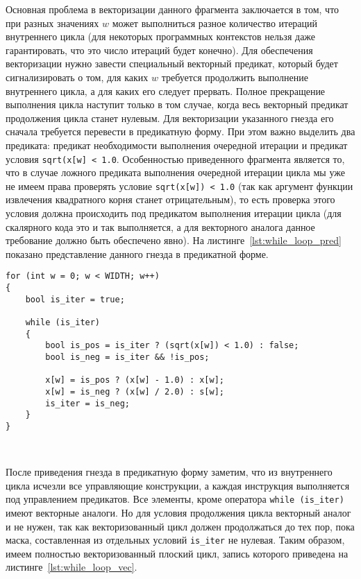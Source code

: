\documentclass[
11pt,%
tightenlines,%
twoside,%
onecolumn,%
nofloats,%
nobibnotes,%
nofootinbib,%
superscriptaddress,%
noshowpacs,%
centertags]%
{revtex4}
\begin{document}
Основная проблема в векторизации данного фрагмента заключается в том, что при разных значениях $w$ может выполниться разное количество итераций внутреннего цикла (для некоторых программных контекстов нельзя даже гарантировать, что это число итераций будет конечно).
Для обеспечения векторизации нужно завести специальный векторный предикат, который будет сигнализировать о том, для каких $w$ требуется продолжить выполнение внутреннего цикла, а для каких его следует прервать.
Полное прекращение выполнения цикла наступит только в том случае, когда весь векторный предикат продолжения цикла станет нулевым.
Для векторизации указанного гнезда его сначала требуется перевести в предикатную форму.
При этом важно выделить два предиката: предикат необходимости выполнения очередной итерации и предикат условия \texttt{sqrt(x[w] < 1.0}.
Особенностью приведенного фрагмента является то, что в случае ложного предиката выполнения очередной итерации цикла мы уже не имеем права проверять условие \texttt{sqrt(x[w]) < 1.0} (так как аргумент функции извлечения квадратного корня станет отрицательным), то есть проверка этого условия должна происходить под предикатом выполнения итерации цикла (для скалярного кода это и так выполняется, а для векторного аналога данное требование должно быть обеспечено явно).
На листинге~\ref{lst:while_loop_pred} показано представление данного гнезда в предикатной форме.

\begin{lstlisting}[caption={Предикатная форма плоского цикла, содержащего цикл с неконстантным числом итераций},label={lst:while_loop_pred}]
for (int w = 0; w < WIDTH; w++)
{
    bool is_iter = true;

    while (is_iter)
    {
        bool is_pos = is_iter ? (sqrt(x[w]) < 1.0) : false;
        bool is_neg = is_iter && !is_pos;    
    
        x[w] = is_pos ? (x[w] - 1.0) : x[w];
        x[w] = is_neg ? (x[w] / 2.0) : s[w];
        is_iter = is_neg;
    }
}
\end{lstlisting}

\

После приведения гнезда в предикатную форму заметим, что из внутреннего цикла исчезли все управляющие конструкции, а каждая инструкция выполняется под управлением предикатов.
Все элементы, кроме оператора \texttt{while (is\_iter)} имеют векторные аналоги.
Но для условия продолжения цикла векторный аналог и не нужен, так как векторизованный цикл должен продолжаться до тех пор, пока маска, составленная из отдельных условий \texttt{is\_iter} не нулевая.
Таким образом, имеем полностью векторизованный плоский цикл, запись которого приведена на листинге~\ref{lst:while_loop_vec}.
\end{document}

